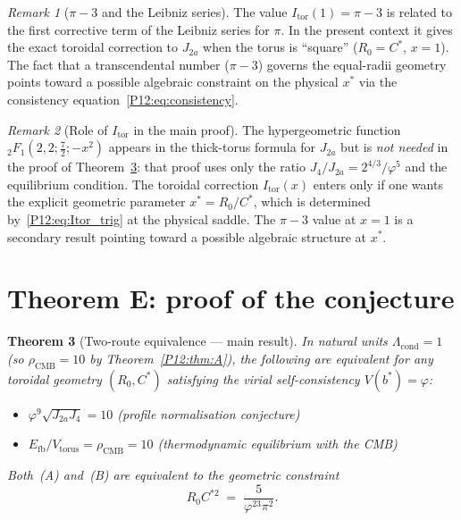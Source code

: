 \documentclass[11pt,a4paper]{article}
\newtheorem{theorem}{Theorem}[section]
\theoremstyle{definition}
\theoremstyle{remark}
\newtheorem{remark}[theorem]{Remark}
\newcommand{\vp}{\varphi}
\newcommand{\Efb}{E_{\mathrm{fb}}}
\newcommand{\Ja}{J_{2a}}
\newcommand{\Jfour}{J_{4}}
\newcommand{\Lcond}{\Lambda_{\mathrm{cond}}}
\newcommand{\rCMB}{\rho_{\mathrm{CMB}}}
\newcommand{\bsF}{{}_2F_1}
\begin{document}
\begin{remark}[$\pi-3$ and the Leibniz series]
\label{P12:rem:pi3_leibniz}
The value $I_{\mathrm{tor}}(1)=\pi-3$ is related to the first
corrective term of the Leibniz series for $\pi$.
In the present context it gives the exact toroidal correction to $\Ja$
when the torus is ``square'' ($R_0=C^*$, $x=1$).
The fact that a transcendental number ($\pi-3$) governs the
equal-radii geometry points toward a possible algebraic constraint
on the physical $x^*$ via the consistency equation~\eqref{P12:eq:consistency}.
\end{remark}

\begin{remark}[Role of $I_{\mathrm{tor}}$ in the main proof]
\label{P12:rem:Itor_role}
The hypergeometric function $\bsF(2,2;\frac{7}{2};-x^2)$ appears
in the thick-torus formula for $\Ja$ but is \emph{not needed}
in the proof of Theorem~\ref{P12:thm:E}: that proof uses only the
ratio $\Jfour/\Ja=2^{4/3}/\vp^5$ and the equilibrium condition.
The toroidal correction $I_{\mathrm{tor}}(x)$ enters only if one
wants the explicit geometric parameter $x^*=R_0/C^*$, which is
determined by~\eqref{P12:eq:Itor_trig} at the physical saddle.
The $\pi-3$ value at $x=1$ is a secondary result pointing toward
a possible algebraic structure at $x^*$.
\end{remark}

\section{Theorem E: proof of the conjecture}
\label{P12:sec:E}

\begin{theorem}[Two-route equivalence --- main result]
\label{P12:thm:E}
In natural units $\Lcond=1$ (so $\rCMB=10$ by Theorem~\ref{P12:thm:A}),
the following are equivalent for any toroidal geometry $(R_0,C^*)$
satisfying the virial self-consistency $V(b^*)=\vp$:
\begin{itemize}[noitemsep]
\item[\textup{(A)}] $\vp^9\sqrt{\Ja\Jfour}=10$
  \quad\textup{(profile normalisation conjecture)}
\item[\textup{(B)}] $\Efb/V_{\mathrm{torus}}=\rCMB=10$
  \quad\textup{(thermodynamic equilibrium with the CMB)}
\end{itemize}
Both~\textup{(A)} and~\textup{(B)} are equivalent to the geometric constraint
\begin{equation}
  \boxed{R_0 C^{*2} \;=\; \frac{5}{\vp^{23}\pi^2}.}
  \label{P12:eq:RC2}
\end{equation}
\end{theorem}
\end{document}
